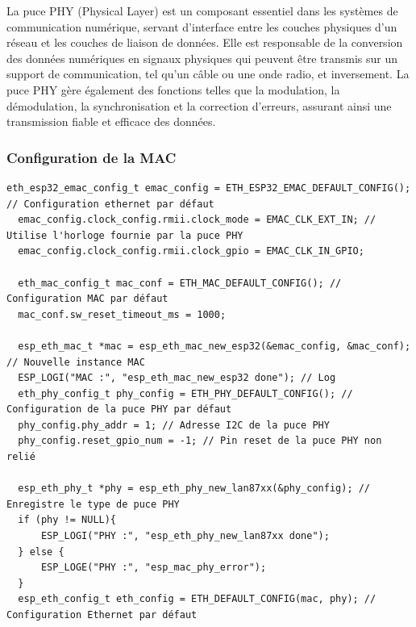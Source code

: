 \documentclass[a4paper,11pt]{article}
\begin{document}
        La puce PHY (Physical Layer) est un composant essentiel dans les systèmes de communication numérique, servant d'interface entre les couches physiques d'un réseau et les couches de liaison de données.\newline
        Elle est responsable de la conversion des données numériques en signaux physiques qui peuvent être transmis sur un support de communication, tel qu'un câble ou une onde radio, et inversement.\newline
        La puce PHY gère également des fonctions telles que la modulation, la démodulation, la synchronisation et la correction d'erreurs, assurant ainsi une transmission fiable et efficace des données.\newline

        \newpage
        \subsubsection{Configuration de la MAC}
        \begin{lstlisting}[style=C, caption={Activation de la puce PHY}]
  eth_esp32_emac_config_t emac_config = ETH_ESP32_EMAC_DEFAULT_CONFIG(); // Configuration ethernet par défaut
  emac_config.clock_config.rmii.clock_mode = EMAC_CLK_EXT_IN; // Utilise l'horloge fournie par la puce PHY
  emac_config.clock_config.rmii.clock_gpio = EMAC_CLK_IN_GPIO; 

  eth_mac_config_t mac_conf = ETH_MAC_DEFAULT_CONFIG(); // Configuration MAC par défaut
  mac_conf.sw_reset_timeout_ms = 1000;

  esp_eth_mac_t *mac = esp_eth_mac_new_esp32(&emac_config, &mac_conf); // Nouvelle instance MAC
  ESP_LOGI("MAC :", "esp_eth_mac_new_esp32 done"); // Log
  eth_phy_config_t phy_config = ETH_PHY_DEFAULT_CONFIG(); // Configuration de la puce PHY par défaut
  phy_config.phy_addr = 1; // Adresse I2C de la puce PHY
  phy_config.reset_gpio_num = -1; // Pin reset de la puce PHY non relié

  esp_eth_phy_t *phy = esp_eth_phy_new_lan87xx(&phy_config); // Enregistre le type de puce PHY
  if (phy != NULL){
      ESP_LOGI("PHY :", "esp_eth_phy_new_lan87xx done");
  } else {
      ESP_LOGE("PHY :", "esp_mac_phy_error");
  }
  esp_eth_config_t eth_config = ETH_DEFAULT_CONFIG(mac, phy); // Configuration Ethernet par défaut
        \end{lstlisting}
\end{document}
